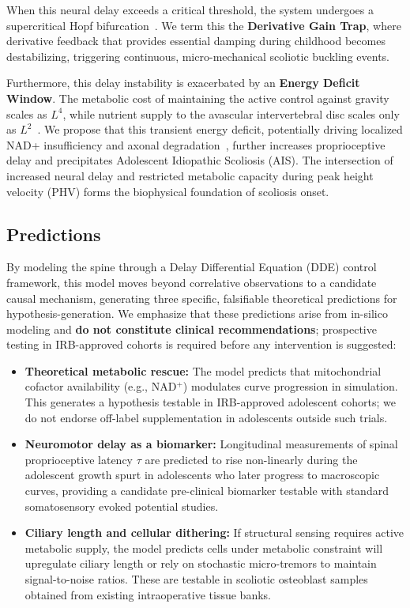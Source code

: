 When this neural delay exceeds a critical threshold, the system undergoes a supercritical Hopf bifurcation~\cite{landry2005dynamics}. We term this the \textbf{Derivative Gain Trap}, where derivative feedback that provides essential damping during childhood becomes destabilizing, triggering continuous, micro-mechanical scoliotic buckling events.

Furthermore, this delay instability is exacerbated by an \textbf{Energy Deficit Window}. The metabolic cost of maintaining the active control against gravity scales as $L^4$, while nutrient supply to the avascular intervertebral disc scales only as $L^2$~\cite{urban2004nutrition, sato2025convective}. We propose that this transient energy deficit, potentially driving localized NAD+ insufficiency and axonal degradation~\cite{basse2021nampt, gerdts2015sarm1}, further increases proprioceptive delay and precipitates Adolescent Idiopathic Scoliosis (AIS). The intersection of increased neural delay and restricted metabolic capacity during peak height velocity (PHV) forms the biophysical foundation of scoliosis onset.

\subsection{Predictions}
By modeling the spine through a Delay Differential Equation (DDE) control framework, this model moves beyond correlative observations to a candidate causal mechanism, generating three specific, falsifiable theoretical predictions for hypothesis-generation. We emphasize that these predictions arise from in-silico modeling and \textbf{do not constitute clinical recommendations}; prospective testing in IRB-approved cohorts is required before any intervention is suggested:

\begin{itemize}
    \item \textbf{Theoretical metabolic rescue:} The model predicts that mitochondrial cofactor availability (e.g., NAD$^+$) modulates curve progression in simulation. This generates a hypothesis testable in IRB-approved adolescent cohorts; we do not endorse off-label supplementation in adolescents outside such trials.
    \item \textbf{Neuromotor delay as a biomarker:} Longitudinal measurements of spinal proprioceptive latency $\tau$ are predicted to rise non-linearly during the adolescent growth spurt in adolescents who later progress to macroscopic curves, providing a candidate pre-clinical biomarker testable with standard somatosensory evoked potential studies.
    \item \textbf{Ciliary length and cellular dithering:} If structural sensing requires active metabolic supply, the model predicts cells under metabolic constraint will upregulate ciliary length or rely on stochastic micro-tremors to maintain signal-to-noise ratios. These are testable in scoliotic osteoblast samples obtained from existing intraoperative tissue banks.
\end{itemize}
